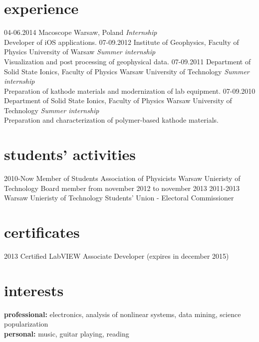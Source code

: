 \documentclass[]{friggeri-cv} %
\begin{document}
\section{experience}

\begin{entrylist}
\entry
	{04-06.2014}
	{Macoscope}
	{Warsaw, Poland}
	{
		\emph{Internship} \\
		Developer of iOS applications.
	}
\entry
	{07-09.2012}
	{Institute of Geophysics, {\normalfont Faculty of Physics}}
	{University of Warsaw}
	{
		\emph{Summer internship} \\
		Visualization and post processing of geophysical data.	
	}
\entry
	{07-09.2011}
	{Department of Solid State Ionics, {\normalfont Faculty of Physics}}
	{Warsaw University of Technology}
	{
		\emph{Summer internship} \\
		Preparation of kathode materials and modernization of lab equipment.
	}
\entry
	{07-09.2010}
	{Department of Solid State Ionics, {\normalfont Faculty of Physics}}
	{Warsaw University of Technology}
	{
		\emph{Summer internship} \\
		Preparation and characterization of polymer-based kathode materials.	
	}
\end{entrylist}

\section{students' activities}

\begin{entrylist}
	\entry
		{2010-Now}
 		{Member of Students Association of Physicists}
 		{Warsaw Unieristy of Technology}
 		{Board member from november 2012 to november 2013}
 	\entry
		{2011-2013}
 		{Warsaw Unieristy of Technology Students' Union - Electoral Commissioner}
 		{}
 		{}
\end{entrylist}

\section{certificates}
\begin{entrylist}
	\entry
		{2013}
 		{Certified LabVIEW Associate Developer {\normalfont(expires in december 2015)}}
 		{}
 		{}
\end{entrylist}

\section{interests}

\textbf{professional:} electronics, analysis of nonlinear systems, data mining, science popularization \\
\textbf{personal:} music, guitar playing, reading
\end{document}
